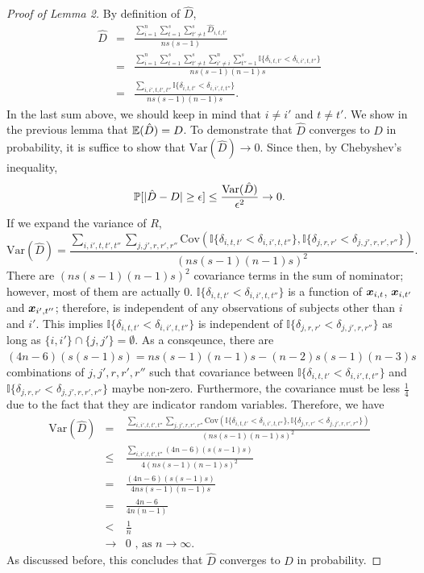 \documentclass{article}
\begin{document}
\begin{proof}[Proof of Lemma 2]
	By definition of $\hat{D}$,
	\begin{eqnarray*}  
		\hat{D} &=&\frac{\sum\limits_{i=1}^{n} \sum\limits_{t=1}^{s}  \sum\limits_{t'\neq t}^{s} \hat{D}_{i,t,t'}}{ns(s-1)}\\
		&=& \frac{\sum\limits_{i=1}^{n} \sum\limits_{t=1}^{s}  \sum\limits_{t'\neq t}^{s}\sum\limits_{i' \neq i}^{n} \sum\limits_{t''=1}^{s} \mathbb{I}\{\delta_{i,t,t'} < \delta_{i,i',t,t''} \} }{ns(s-1)(n-1)s}\\
		&=& \frac{\sum\limits_{i,i',t,t',t''} \mathbb{I}\{\delta_{i,t,t'} < \delta_{i,i',t,t''} \}  }{ns(s-1)(n-1)s} .
	\end{eqnarray*}
	In the last sum above, we should keep in mind that $i\neq i'$ and $t \neq t'$. We show in the previous lemma that $\mathbb{E}(\hat{D})=D$. To demonstrate that $\hat{D}$ converges to $D$ in probability, it is suffice to show that $\text{Var}(\hat{D}) \rightarrow 0$. Since then, by Chebyshev's inequality,
	\[\mathbb{P}[|\hat{D}-D| \geq \epsilon] \leq \frac{\text{Var}(\hat{D})}{\epsilon^2} \rightarrow 0 .\]
	If we expand the variance of $R$, 
	\[\text{Var}(\hat{D})= \frac{\sum\limits_{i,i',t,t',t''} \sum\limits_{j,j',r,r',r''} \text{Cov}(\mathbb{I}\{\delta_{i,t,t'} < \delta_{i,i',t,t''} \},\mathbb{I}\{\delta_{j,r,r'} < \delta_{j,j',r,r',r''} \})}{(ns(s-1)(n-1)s)^2} . \]
	There are $(ns(s-1)(n-1)s)^2$ covariance terms in the sum of nominator; however, most of them are actually $0$. $\mathbb{I}\{\delta_{i,t,t'} < \delta_{i,i',t,t''}\}$ is a function of $\boldsymbol{x}_{i,t}$, $\boldsymbol{x}_{i,t'}$ and $\boldsymbol{x}_{i',t''}$; therefore, is independent of any observations of subjects other than $i$ and $i'$. This implies $\mathbb{I}\{\delta_{i,t,t'} < \delta_{i,i',t,t''} \}$ is independent of $\mathbb{I}\{\delta_{j,r,r'} < \delta_{j,j',r,r''} \}$ as long as $\{i,i'\} \cap \{j,j'\} = \emptyset$. As a consqeunce, there are $(4n-6)(s(s-1)s)=ns(s-1)(n-1)s-(n-2)s(s-1)(n-3)s$ combinations of $j,j',r,r',r''$ such that covariance between $\mathbb{I}\{\delta_{i,t,t'} < \delta_{i,i',t,t''} \}$ and $\mathbb{I}\{\delta_{j,r,r'} < \delta_{j,j',r,r',r''} \}$ maybe non-zero. Furthermore, the covariance must be less $\frac{1}{4}$ due to the fact that they are indicator random variables. Therefore, we have 
	\begin{eqnarray*} 
		\text{Var}(\hat{D})&=& \frac{\sum\limits_{i,i',t,t',t''} \sum\limits_{j,j',r,r',r''} \text{Cov}(\mathbb{I}\{\delta_{i,t,t'} < \delta_{i,i',t,t''} \},\mathbb{I}\{\delta_{j,r,r'} < \delta_{j,j',r,r',r''} \})}{(ns(s-1)(n-1)s)^2} \\
		&\leq& \frac{\sum\limits_{i,i',t,t',t''}  (4n-6)(s(s-1)s)}{4(ns(s-1)(n-1)s)^2} \\
		&=& \frac{ (4n-6)(s(s-1)s)}{4ns(s-1)(n-1)s} \\
		&=& \frac{4n-6}{4n(n-1)} \\
		&<& \frac{1}{n}  \\
		&\rightarrow& 0 \text{ , as $n\rightarrow \infty$.} 
	\end{eqnarray*}
	As discussed before, this concludes that $\hat{D}$ converges to $D$ in probability. 
\end{proof}
\end{document}
